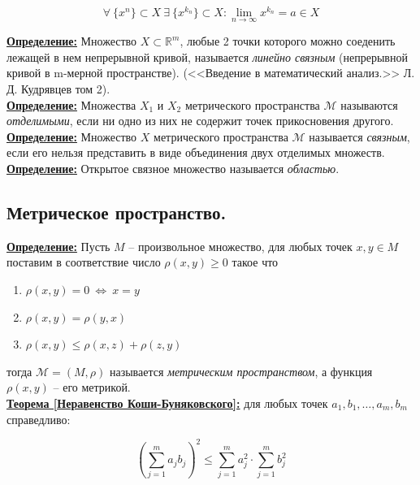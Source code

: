 \documentclass[a4paper,12pt]{article} %
\begin{document}
	\[ \forall ~ \{x^n \} \subset X ~ \exists ~ \{x^{k_n} \} \subset X : \lim\limits_{n \to \infty} x^{k_n} = a \in X \]
	
	\underline{\textbf{Определение:}} Множество $X \subset \mathbb{R}^m$, любые 2 точки которого можно соеденить лежащей в нем непрерывной кривой, называется \textit{линейно связным} (непрерывной кривой в m-мерной пространстве). (<<Введение в математический анализ.>> Л. Д. Кудрявцев том 2).\\
	
	\underline{\textbf{Определение:}} Множества $X_1$ и $X_2$ метрического пространства $\mathscr{M}$ называются \textit{отделимыми}, если ни одно из них не содержит точек прикосновения другого.\\
	
	\underline{\textbf{Определение:}} Множество $X$ метрического пространства $\mathscr{M}$ называется \textit{связным}, если его нельзя представить в виде объединения двух отделимых множеств.\\
	
	\underline{\textbf{Определение:}} Открытое связное множество называется \textit{областью}.\\
	
	\subsection{Метрическое пространство.}
	
	\underline{\textbf{Определение:}} Пусть $M$ -- произвольное множество, для любых точек $x, y \in M$ поставим в соответствие число $\rho(x, y) \geqslant 0$ такое что
	\begin{enumerate}
		\item $\rho(x, y) = 0 ~ \Leftrightarrow ~ x = y$
		\item $\rho(x, y) = \rho(y, x)$
		\item $\rho(x, y) \leqslant \rho(x, z) + \rho(z, y)$
	\end{enumerate}
	\noindent тогда $\mathscr{M} = (M, \rho)$ называется \textit{метрическим пространством}, а функция $\rho(x, y)$ -- его метрикой.\\
	
	\underline{\textbf{Теорема [Неравенство Коши-Буняковского]:}} для любых точек $a_1, b_1, \dots, a_m, b_m$ справедливо:
	
	\begin{equation*}
		\left( \sum\limits_{j = 1}^{m} a_j b_j \right)^2 \leqslant \sum\limits_{j = 1}^{m} a_j^2 \cdot \sum\limits_{j = 1}^{m} b_j^2
	\end{equation*}
	
\end{document}
